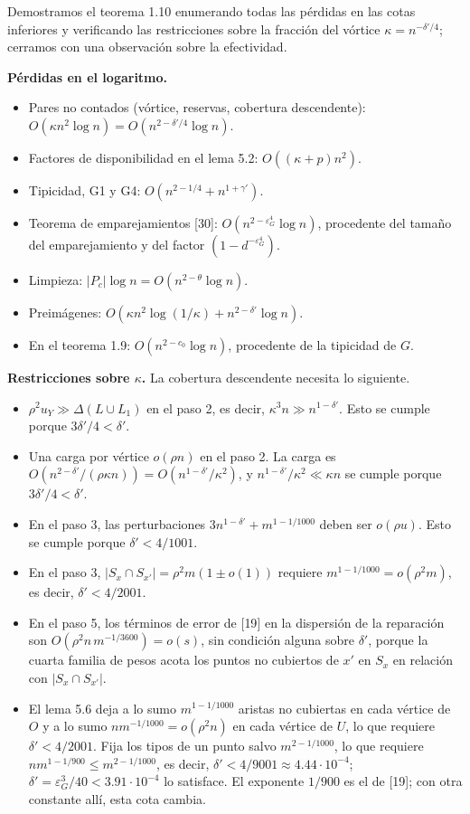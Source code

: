 \documentclass[spanish,11pt,a4paper]{article}
\providecommand{\tightlist}{\setlength{\itemsep}{0pt}\setlength{\parskip}{0pt}}
\begin{document}
Demostramos el teorema 1.10 enumerando todas las pérdidas en las cotas inferiores y verificando las restricciones sobre la fracción del vórtice \(\kappa=n^{-\delta'/4}\); cerramos con una observación sobre la efectividad.

\textbf{Pérdidas en el logaritmo.}

\begin{itemize}
\tightlist
\item
  Pares no contados (vórtice, reservas, cobertura descendente): \(O(\kappa n^2\log n)=O(n^{2-\delta'/4}\log n)\).
\item
  Factores de disponibilidad en el lema 5.2: \(O((\kappa+p)n^2)\).
\item
  Tipicidad, G1 y G4: \(O(n^{2-1/4}+n^{1+\gamma'})\).
\item
  Teorema de emparejamientos {[}30{]}: \(O(n^{2-\varepsilon_G^4}\log n)\), procedente del tamaño del emparejamiento y del factor \((1-d^{-\varepsilon_G^4})\).
\item
  Limpieza: \(|P_c|\log n=O(n^{2-\theta}\log n)\).
\item
  Preimágenes: \(O(\kappa n^2\log(1/\kappa)+n^{2-\delta'}\log n)\).
\item
  En el teorema 1.9: \(O(n^{2-c_0}\log n)\), procedente de la tipicidad de \(G\).
\end{itemize}

\textbf{Restricciones sobre \(\kappa\).} La cobertura descendente necesita lo siguiente.

\begin{itemize}
\tightlist
\item
  \(\rho^2u_Y\gg\Delta(L\cup L_1)\) en el paso 2, es decir, \(\kappa^3n\gg n^{1-\delta'}\). Esto se cumple porque \(3\delta'/4<\delta'\).
\item
  Una carga por vértice \(o(\rho n)\) en el paso 2. La carga es \(O(n^{2-\delta'}/(\rho\kappa n))=O(n^{1-\delta'}/\kappa^2)\), y \(n^{1-\delta'}/\kappa^2\ll\kappa n\) se cumple porque \(3\delta'/4<\delta'\).
\item
  En el paso 3, las perturbaciones \(3n^{1-\delta'}+m^{1-1/1000}\) deben ser \(o(\rho u)\). Esto se cumple porque \(\delta'<4/1001\).
\item
  En el paso 3, \(|S_x\cap S_{x'}|=\rho^2m(1\pm o(1))\) requiere \(m^{1-1/1000}=o(\rho^2m)\), es decir, \(\delta'<4/2001\).
\item
  En el paso 5, los términos de error de {[}19{]} en la dispersión de la reparación son \(O(\rho^2n\,m^{-1/3600})=o(s)\), sin condición alguna sobre \(\delta'\), porque la cuarta familia de pesos acota los puntos no cubiertos de \(x'\) en \(S_x\) en relación con \(|S_x\cap S_{x'}|\).
\item
  El lema 5.6 deja a lo sumo \(m^{1-1/1000}\) aristas no cubiertas en cada vértice de \(O\) y a lo sumo \(nm^{-1/1000}=o(\rho^2n)\) en cada vértice de \(U\), lo que requiere \(\delta'<4/2001\). Fija los tipos de un punto salvo \(m^{2-1/1000}\), lo que requiere \(nm^{1-1/900}\le m^{2-1/1000}\), es decir, \(\delta'<4/9001\approx4.44\cdot10^{-4}\); \(\delta'=\varepsilon_G^3/40<3.91\cdot10^{-4}\) lo satisface. El exponente \(1/900\) es el de {[}19{]}; con otra constante allí, esta cota cambia.
\end{itemize}
\end{document}
